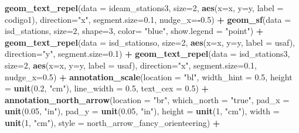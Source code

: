 \documentclass[12pt,twoside]{reedthesis}
\newenvironment{Shaded}{\begin{snugshade}}{\end{snugshade}}
\newcommand{\DataTypeTok}[1]{\textcolor[rgb]{0.13,0.29,0.53}{#1}}
\newcommand{\DecValTok}[1]{\textcolor[rgb]{0.00,0.00,0.81}{#1}}
\newcommand{\FloatTok}[1]{\textcolor[rgb]{0.00,0.00,0.81}{#1}}
\newcommand{\KeywordTok}[1]{\textcolor[rgb]{0.13,0.29,0.53}{\textbf{#1}}}
\newcommand{\NormalTok}[1]{#1}
\newcommand{\OperatorTok}[1]{\textcolor[rgb]{0.81,0.36,0.00}{\textbf{#1}}}
\newcommand{\StringTok}[1]{\textcolor[rgb]{0.31,0.60,0.02}{#1}}
\begin{document}
\begin{Shaded}
\begin{Highlighting}[]
{{{{\StringTok{  }\KeywordTok{geom_text_repel}\NormalTok{(}\DataTypeTok{data =}\NormalTok{ ideam_stations3, }\DataTypeTok{size=}\DecValTok{2}\NormalTok{, }\KeywordTok{aes}\NormalTok{(}\DataTypeTok{x=}\NormalTok{x, }\DataTypeTok{y=}\NormalTok{y, }\DataTypeTok{label =}\NormalTok{ codigo1), }\DataTypeTok{direction=}\StringTok{"x"}\NormalTok{, }\DataTypeTok{segment.size=}\FloatTok{0.1}\NormalTok{, }\DataTypeTok{nudge_x=}\OperatorTok{-}\FloatTok{0.5}\NormalTok{) }\OperatorTok{+}
\StringTok{  }\KeywordTok{geom_sf}\NormalTok{(}\DataTypeTok{data =}\NormalTok{ isd_stations, }\DataTypeTok{size=}\DecValTok{2}\NormalTok{, }\DataTypeTok{shape=}\DecValTok{3}\NormalTok{, }\DataTypeTok{color=} \StringTok{"blue"}\NormalTok{, }\DataTypeTok{show.legend =} \StringTok{"point"}\NormalTok{) }\OperatorTok{+}
\StringTok{  }\KeywordTok{geom_text_repel}\NormalTok{(}\DataTypeTok{data =}\NormalTok{ isd_stationso, }\DataTypeTok{size=}\DecValTok{2}\NormalTok{, }\KeywordTok{aes}\NormalTok{(}\DataTypeTok{x=}\NormalTok{x, }\DataTypeTok{y=}\NormalTok{y, }\DataTypeTok{label =}\NormalTok{ usaf), }\DataTypeTok{direction=}\StringTok{"y"}\NormalTok{, }\DataTypeTok{segment.size=}\FloatTok{0.1}\NormalTok{) }\OperatorTok{+}
\StringTok{  }\KeywordTok{geom_text_repel}\NormalTok{(}\DataTypeTok{data =}\NormalTok{ isd_stations3, }\DataTypeTok{size=}\DecValTok{2}\NormalTok{, }\KeywordTok{aes}\NormalTok{(}\DataTypeTok{x=}\NormalTok{x, }\DataTypeTok{y=}\NormalTok{y, }\DataTypeTok{label =}\NormalTok{ usaf), }\DataTypeTok{direction=}\StringTok{"x"}\NormalTok{, }\DataTypeTok{segment.size=}\FloatTok{0.1}\NormalTok{, }\DataTypeTok{nudge_x=}\FloatTok{0.5}\NormalTok{) }\OperatorTok{+}
\StringTok{  }\KeywordTok{annotation_scale}\NormalTok{(}\DataTypeTok{location =} \StringTok{"bl"}\NormalTok{, }\DataTypeTok{width_hint =} \FloatTok{0.5}\NormalTok{, }\DataTypeTok{height =} \KeywordTok{unit}\NormalTok{(}\FloatTok{0.2}\NormalTok{, }\StringTok{"cm"}\NormalTok{), }\DataTypeTok{line_width =} \FloatTok{0.5}\NormalTok{, }\DataTypeTok{text_cex =} \FloatTok{0.5}\NormalTok{) }\OperatorTok{+}\StringTok{ }
\StringTok{  }\KeywordTok{annotation_north_arrow}\NormalTok{(}\DataTypeTok{location =} \StringTok{"br"}\NormalTok{, }\DataTypeTok{which_north =} \StringTok{"true"}\NormalTok{, }\DataTypeTok{pad_x =} \KeywordTok{unit}\NormalTok{(}\FloatTok{0.05}\NormalTok{, }\StringTok{"in"}\NormalTok{), }\DataTypeTok{pad_y =} \KeywordTok{unit}\NormalTok{(}\FloatTok{0.05}\NormalTok{, }\StringTok{"in"}\NormalTok{), }\DataTypeTok{height =} \KeywordTok{unit}\NormalTok{(}\DecValTok{1}\NormalTok{, }\StringTok{"cm"}\NormalTok{), }
   \DataTypeTok{width =} \KeywordTok{unit}\NormalTok{(}\DecValTok{1}\NormalTok{, }\StringTok{"cm"}\NormalTok{), }\DataTypeTok{style =}\NormalTok{ north_arrow_fancy_orienteering) }\OperatorTok{+}
}}}}
\end{Highlighting}
\end{Shaded}
\end{document}
